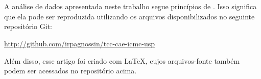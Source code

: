 \section{}
\label{ap:rr}

A análise de dados apresentada neste trabalho segue princípios de  \cite{Peng2011}. Isso significa que ela pode ser reproduzida utilizando os arquivos disponibilizados no seguinte repositório Git:

\begin{center}
	\url{http://github.com/irpagnossin/tcc-cae-icmc-usp}
\end{center}

Além disso, esse artigo foi criado com \LaTeX, cujos arquivos-fonte também podem ser acessados no repositório acima.
